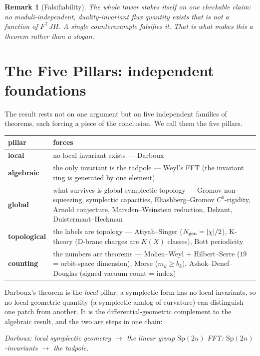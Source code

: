 \documentclass[11pt]{article}
\newtheorem{remark}{Remark}
\newcommand{\flux}{F}
\newcommand{\hh}{H}
\begin{document}
\begin{remark}[Falsifiability]
The whole tower stakes itself on one checkable claim: \emph{no moduli-independent,
duality-invariant flux quantity exists that is not a function of $\flux^\top J\hh$.}
A single counterexample falsifies it. That is what makes this a theorem rather than
a slogan.
\end{remark}

\section{The Five Pillars: independent foundations}

The result rests not on one argument but on five independent families of theorems, each
forcing a piece of the conclusion. We call them the five pillars.

\begin{center}
\begin{tabular}{ll}
\toprule
pillar & forces \\
\midrule
\textbf{local} & no local invariant exists --- Darboux \\
\textbf{algebraic} & the only invariant is the tadpole --- Weyl's FFT (the invariant ring is generated by one element) \\
\textbf{global} & what survives is global symplectic topology --- Gromov non-squeezing, symplectic capacities, Eliashberg--Gromov $C^0$-rigidity, Arnold conjecture, Marsden--Weinstein reduction, Delzant, Duistermaat--Heckman \\
\textbf{topological} & the labels are topology --- Atiyah--Singer ($N_{\rm gen}=|\chi|/2$), K-theory (D-brane charges are $K(X)$ classes), Bott periodicity \\
\textbf{counting} & the numbers are theorems --- Molien--Weyl + Hilbert--Serre ($19$ = orbit-space dimension), Morse ($m_k\ge b_k$), Ashok--Denef--Douglas (signed vacuum count = index) \\
\bottomrule
\end{tabular}
\end{center}

Darboux's theorem is the \emph{local} pillar: a symplectic form has no local invariants,
so no local geometric quantity (a symplectic analog of curvature) can distinguish one
patch from another. It is the differential-geometric complement to the algebraic result,
and the two are steps in one chain:

\begin{center}
\emph{Darboux: local symplectic geometry $\to$ the linear group $\mathrm{Sp}(2n)$} \quad
\emph{FFT: $\mathrm{Sp}(2n)$-invariants $\to$ the tadpole.}
\end{center}
\end{document}
